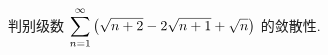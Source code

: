 
\begin{example}
    判别级数 $\displaystyle \sum_{n=1}^{\infty}\qty(\sqrt{n+2}-2 \sqrt{n+1}+\sqrt{n}) $ 的敛散性.
\end{example}
